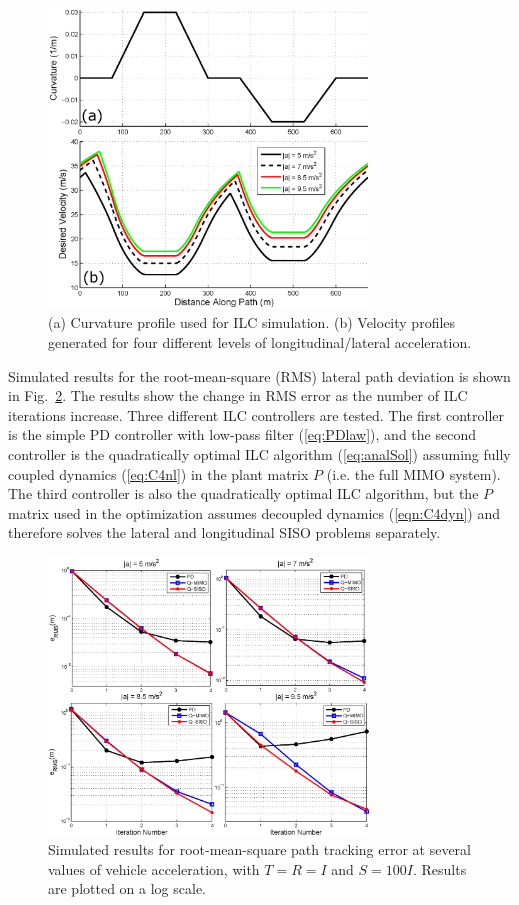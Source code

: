 \documentclass[9pt,shortpaper,twoside,web]{ieeecolor}
\begin{document}
{{{\begin{figure}[bh]
\centering
\includegraphics[width= 3.35in]{figures/simSetup.eps}
\caption[Curvature profile used for ILC simulation.]{ (a) Curvature profile used for ILC simulation. (b) Velocity profiles generated for four different levels of longitudinal/lateral acceleration. }
\label{fig:simSetup}
\end{figure}

Simulated results for the root-mean-square (RMS) lateral path deviation is shown in Fig.~\ref{fig:simRes1}. The results
show the change in RMS error as the number of ILC iterations increase. Three different ILC controllers are tested. 
The first controller is the simple PD controller
with low-pass filter (\ref{eq:PDlaw}), and the second controller is the quadratically optimal ILC algorithm (\ref{eq:analSol}) assuming fully coupled dynamics (\ref{eq:C4nl}) in the plant
matrix $P$ (i.e. the full MIMO system).
The third controller is also the quadratically optimal ILC algorithm, but the $P$ matrix used in the optimization
assumes decoupled dynamics (\ref{eqn:C4dyn}) and therefore solves the lateral and longitudinal SISO problems separately. 

\begin{figure}[h!]
\centering
\includegraphics[width=3.35in]{figures/simRes1.eps}
\caption[Simulated results for root-mean-square path tracking error at several values of vehicle acceleration]{Simulated results for root-mean-square path tracking error at several values of vehicle acceleration, with $T = R = I$ and $S = \mathrm{100} I$.
Results are plotted on a log scale.}
\label{fig:simRes1}
\end{figure}

}}}
\end{document}
